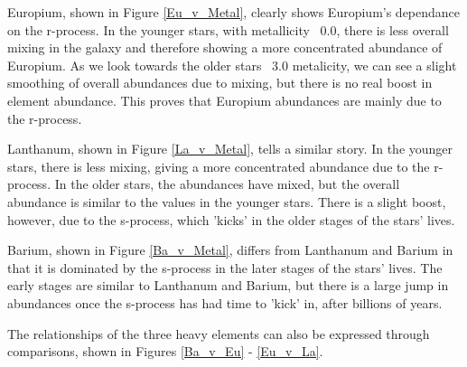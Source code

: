 Europium, shown in Figure \ref{Eu_v_Metal}, clearly shows Europium's dependance on the r-process. In the younger stars, with metallicity ~0.0, there is less overall mixing in the galaxy and therefore showing a more concentrated abundance of Europium. As we look towards the older stars ~3.0 metalicity, we can see a slight smoothing of overall abundances due to mixing, but there is no real boost in element abundance. This proves that Europium abundances are mainly due to the r-process.

Lanthanum, shown in Figure \ref{La_v_Metal}, tells a similar story. In the younger stars, there is less mixing, giving a more concentrated abundance due to the r-process. In the older stars, the abundances have mixed, but the overall abundance is similar to the values in the younger stars. There is a slight boost, however, due to the s-process, which 'kicks' in the older stages of the stars' lives. 

Barium, shown in Figure \ref{Ba_v_Metal}, differs from Lanthanum and Barium in that it is dominated by the s-process in the later stages of the stars' lives. The early stages are similar to Lanthanum and Barium, but there is a large jump in abundances once the s-process has had time to 'kick' in, after billions of years.

The relationships of the three heavy elements can also be expressed through comparisons, shown in Figures \ref{Ba_v_Eu} - \ref{Eu_v_La}.

